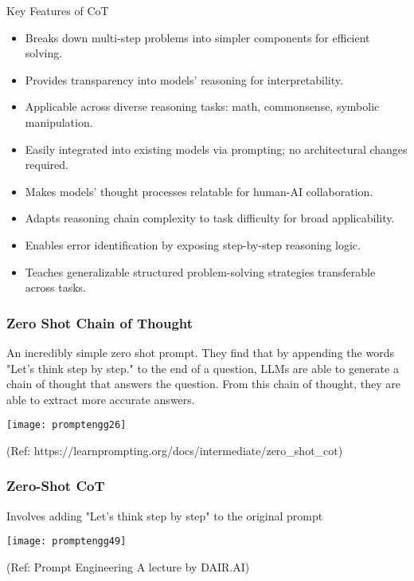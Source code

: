 \begin{frame}[fragile]{Key Features of CoT}
    \begin{itemize}
        \item Breaks down multi-step problems into simpler components for efficient solving.
        \item Provides transparency into models' reasoning for interpretability.
        \item Applicable across diverse reasoning tasks: math, commonsense, symbolic manipulation.
        \item Easily integrated into existing models via prompting; no architectural changes required.
        \item Makes models' thought processes relatable for human-AI collaboration.
        \item Adapts reasoning chain complexity to task difficulty for broad applicability.
        \item Enables error identification by exposing step-by-step reasoning logic.
        \item Teaches generalizable structured problem-solving strategies transferable across tasks.
    \end{itemize}
\end{frame}

\begin{frame}[fragile]\frametitle{Zero Shot Chain of Thought}

An incredibly simple zero shot prompt. They find that by appending the words "Let's think step by step." to the end of a question, LLMs are able to generate a chain of thought that answers the question. From this chain of thought, they are able to extract more accurate answers.

\begin{center}
\texttt{[image: promptengg26]}

{\tiny (Ref: https://learnprompting.org/docs/intermediate/zero\_shot\_cot)}

\end{center}		

\end{frame}

\begin{frame}[fragile]\frametitle{Zero-Shot CoT}

 Involves adding "Let's think step by step" to the original 
prompt


\begin{center}
\texttt{[image: promptengg49]}

{\tiny (Ref: Prompt Engineering A lecture by DAIR.AI)}

\end{center}	

\end{frame}

